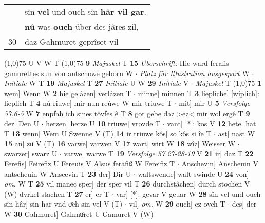 \documentclass[8pt,a4paper,notitlepage]{article}
\begin{document}
\begin{table}[ht]
\begin{minipage}[t]{0.5\linewidth}
\begin{tabular}{rl}
 & sîn \textbf{vel} und ouch sîn \textbf{hâr vil gar}.\\ 
 & \textbf{nû} was \textbf{ouch} über des jâres zil,\\ 
30 & daz Gahmuret geprîset vil\\ 
\end{tabular}
\scriptsize
\line(1,0){75} \newline
U V W T \newline
\line(1,0){75} \newline
\textbf{9} \textit{Majuskel} T  \textbf{15} \textit{Überschrift:} Hie ward ferafis gamurettes sun von antschowe geborn W   $\cdot$ \textit{Platz für Illustration ausgespart} W   $\cdot$ \textit{Initiale} W T  \textbf{19} \textit{Majuskel} T  \textbf{27} \textit{Initiale} U W  \textbf{29} \textit{Initiale} V   $\cdot$ \textit{Majuskel} T  \newline
\line(1,0){75} \newline
\textbf{1} wem] Wenn W \textbf{2} hie gelâzen] verlâzen T  $\cdot$ minne] minnen T \textbf{3} lieplîche] [wiplich]: lieplich T \textbf{4} nû riuwe] mir nun reúwe W mir triuwe T  $\cdot$ mit] mir U \textbf{5} \textit{Versfolge 57.6-5} W  \textbf{7} enpfah ich sines tôvfes ê T \textbf{8} got gebe daz >ez< mir wol ergê T \textbf{9} der] Den U  $\cdot$ herzen] herze U \textbf{10} triuwe] vrovde T  $\cdot$ vant] [*]: kos V \textbf{12} hete] hat T \textbf{13} wenn] Wem U Swenne V (T) \textbf{14} ir triuwe kôs] so kôs si îe T  $\cdot$ ast] nast W \textbf{15} an] zuͦ V (T) \textbf{16} varwe] varwen V \textbf{17} wart] wirt W \textbf{18} wîz] Weisser W  $\cdot$ swarzer] swarz U  $\cdot$ varwe] warwe T \textbf{19} \textit{Versfolge 57.27-28-19} V  \textbf{21} ir] daz T \textbf{22} Ferefis] Feirefiz U Fereuis V Alsus ferafiß W Fereifiz T  $\cdot$ Anschevin] Anscheuin V antscheuin W Anscevin T \textbf{23} der] Dir U  $\cdot$ waltswende] walt swinde U \textbf{24} von] \textit{om.} W T \textbf{25} vil manec sper] der sper vil T \textbf{26} durchstâchen] durch stochen V (W) dvrkel stachen T \textbf{27} er] \sout{er} T  $\cdot$ var] [*]: gevar V geuar W \textbf{28} sîn vel und ouch sîn hâr] sin har vnd oͮch sin vel V (T)  $\cdot$ vil] \textit{om.} W \textbf{29} ouch] ez ovch T  $\cdot$ des] der W \textbf{30} Gahmuret] Gahmuͦret U Gamuret V (W) \newline
\end{minipage}
\end{table}
\end{document}

